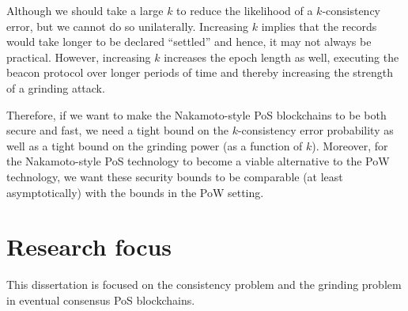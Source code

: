 Although we should take a large $k$ to 
reduce the likelihood of a $k$-consistency error, but 
we cannot do so unilaterally. 
Increasing $k$ implies that the records 
would take longer to be declared ``settled'' 
and hence, it may not always be practical.
However, increasing $k$ 
increases the epoch length as well, 
executing the beacon protocol over longer periods of time and 
thereby increasing the strength of a grinding attack. 

Therefore, 
if we want to make the Nakamoto-style PoS blockchains to be 
both secure and fast, 
we need a tight bound on the $k$-consistency error probability
as well as 
a tight bound on the grinding power (as a function of $k$). 
Moreover, 
for the Nakamoto-style PoS technology  
to become a viable alternative to the PoW technology, 
we want these security bounds to be comparable (at least asymptotically) 
with the bounds in the PoW setting.













\section{Research focus}\label{sec:intro-focus}
This dissertation is focused on the consistency problem and the grinding problem in 
eventual consensus PoS blockchains. 

